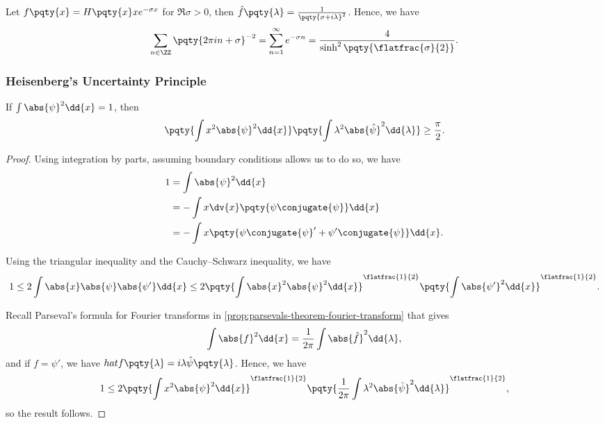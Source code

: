 \begin{example}
    Let \(f\pqty{x} = H\pqty{x} x e^{- \sigma x}\) for \(\Re \sigma > 0\), then \(\hat{f} \pqty{\lambda} = \frac{1}{\pqty{\sigma + i \lambda}^2}\). Hence, we have
    \begin{equation}
        \sum_{n \in \ZZ} \pqty{2 \pi i n + \sigma}^{-2} = \sum_{n = 1}^{\infty} e^{- \sigma n} = \frac{4}{\sinh^2 \pqty{\flatfrac{\sigma}{2}}}.
    \end{equation}
\end{example}

\subsubsection{Heisenberg's Uncertainty Principle}

\begin{proposition}
    If \(\int \abs{\psi}^2 \dd{x} = 1\), then
    \begin{equation}
        \pqty{\int x^2 \abs{\psi}^2 \dd{x}} \pqty{\int \lambda^2 \abs{\hat{\psi}}^2 \dd{\lambda}} \geq \frac{\pi}{2}.
    \end{equation}
\end{proposition}

\begin{proof}
    Using integration by parts, assuming boundary conditions allows us to do so, we have
    \begin{subequations}
        \begin{align}
            1 &= \int \abs{\psi}^2 \dd{x} \\
            &= - \int x \dv{x} \pqty{\psi \conjugate{\psi}} \dd{x} \\
            &= - \int x \pqty{\psi \conjugate{\psi}' + \psi' \conjugate{\psi}} \dd{x}.
        \end{align}
    \end{subequations}

    Using the triangular inequality and the Cauchy--Schwarz inequality, we have
    \begin{equation}
        1 \leq 2 \int \abs{x} \abs{\psi} \abs{\psi'} \dd{x} \leq 2 \pqty{\int \abs{x}^2 \abs{\psi}^2 \dd{x}}^{\flatfrac{1}{2}} \pqty{\int \abs{\psi'}^2 \dd{x}}^{\flatfrac{1}{2}}.
    \end{equation}

    Recall Parseval's formula for Fourier transforms in \autoref{prop:parsevals-theorem-fourier-transform} that gives
    \begin{equation}
        \int \abs{f}^2 \dd{x} = \frac{1}{2 \pi} \int \abs{\hat{f}}^2 \dd{\lambda},
    \end{equation}
    and if \(f = \psi'\), we have \(hat{f} \pqty{\lambda} = i \lambda \hat{\psi} \pqty{\lambda}\). Hence, we have
    \begin{equation}
        1 \leq 2 \pqty{\int x^2 \abs{\psi}^2 \dd{x}}^{\flatfrac{1}{2}} \pqty{\frac{1}{2 \pi} \int \lambda^2 \abs{\hat{\psi}}^2 \dd{\lambda}}^{\flatfrac{1}{2}},
    \end{equation}
    so the result follows.
\end{proof}

